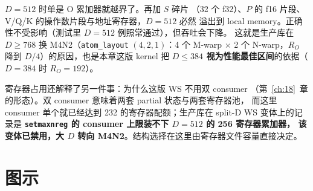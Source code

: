 $D {=} 512$ 时单是 O 累加器就越界了。再加 $S$ 碎片
（32 个 f32）、$P$ 的 f16 片段、V/Q/K 的操作数片段与地址寄存器，$D=512$ 必然
溢出到 local memory。正确性不受影响（测试里 $D{=}512$ 例照常通过），但吞吐会下降。
这就是生产库在 $D \ge 768$ 换 M4N2（\texttt{atom\_layout} $(4,2,1)$：4 个 M-warp
$\times$ 2 个 N-warp，$R_O$ 降到 $D/4$）的原因，也是本章这版 kernel 把
\textbf{$D \le 384$ 视为性能最佳区间}的依据（$D=384$ 时 $R_O = 192$）。

寄存器占用还解释了另一件事：为什么这版 WS 不用双 consumer
（第~\ref{ch:18}~章的形态）。双 consumer 意味着两套 partial 状态与两套寄存器池，
而这里 consumer 单个就已经达到 232 的寄存器配额；生产库在 split-D WS 变体上的记录是
\textbf{\texttt{setmaxnreg} 的 consumer 上限装不下 $D{=}512$ 的 256 寄存器累加器，
该变体已禁用，大 $D$ 转向 M4N2}。结构选择在这里由寄存器文件容量直接决定。

\needspace{117mm}

\section{图示}

